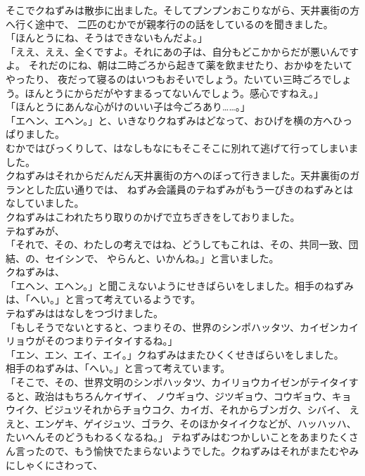 \documentclass[
a4paper,
10pt,
book]
{tarticle}
\begin{document}
\indent そこでクねずみは散歩に出ました。そしてプンプンおこりながら、天井裏街の方へ行く途中で、
二匹のむかでが親孝行のの話をしているのを聞きました。\indent \\
「ほんとうにね、そうはできないもんだよ。」\\
「ええ、ええ、全くですよ。それにあの子は、自分もどこかからだが悪いんですよ。
それだのにね、朝は二時ごろから起きて薬を飲ませたり、おかゆをたいてやったり、
夜だって寝るのはいつもおそいでしょう。たいてい三時ごろでしょう。ほんとうにからだがやすまるってないんでしょう。感心ですねえ。」\\
「ほんとうにあんな心がけのいい子は今ごろあり……。」\\
「エヘン、エヘン。」と、いきなりクねずみはどなって、おひげを横の方へひっぱりました。\\
\indent むかではびっくりして、はなしもなにもそこそこに別れて逃げて行ってしまいました。\\
\indent クねずみはそれからだんだん天井裏街の方へのぼって行きました。天井裏街のガランとした広い通りでは、
ねずみ会議員のテねずみがもう一ぴきのねずみとはなしていました。\\
\indent クねずみはこわれたちり取りのかげで立ちぎきをしておりました。\\
\indent テねずみが、\\
「それで、その、わたしの考えではね、どうしてもこれは、その、共同一致、団結、の、セイシンで、
やらんと、いかんね。」と言いました。\\
\indent クねずみは、\\
「エヘン、エヘン。」と聞こえないようにせきばらいをしました。相手のねずみは、「へい。」と言って考えているようです。\\
\indent テねずみははなしをつづけました。\\
「もしそうでないとすると、つまりその、世界のシンポハッタツ、カイゼンカイリョウがそのつまりテイタイするね。」\\
「エン、エン、エイ、エイ。」クねずみはまたひくくせきばらいをしました。\\
\indent 相手のねずみは、「へい。」と言って考えています。\\
「そこで、その、世界文明のシンポハッタツ、カイリョウカイゼンがテイタイすると、政治はもちろんケイザイ、
ノウギョウ、ジツギョウ、コウギョウ、キョウイク、ビジュツそれからチョウコク、カイガ、それからブンガク、シバイ、
ええと、エンゲキ、ゲイジュツ、ゴラク、そのほかタイイクなどが、ハッハッハ、たいへんそのどうもわるくなるね。」
テねずみはむつかしいことをあまりたくさん言ったので、もう愉快でたまらないようでした。クねずみはそれがまたむやみにしゃくにさわって、
\end{document}
